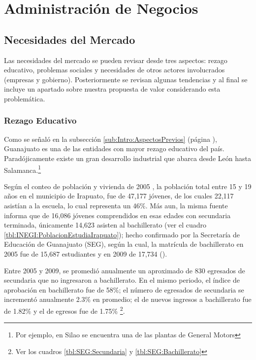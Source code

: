 \chapter{Administración de Negocios}
\label{ch:AdministracionNegocios}

\section{Necesidades del Mercado}

Las necesidades del mercado se pueden revisar desde tres aspectos: rezago educativo, problemas sociales y necesidades de otros actores involucrados (empresas y gobierno). Posteriormente se revisan algunas tendencias y al final se incluye un apartado sobre nuestra propuesta de valor considerando esta problemática.

\subsection{Rezago Educativo}

Como se señaló en la subsección \ref{sub:Intro:AspectosPrevios} (página \pageref{sub:Intro:AspectosPrevios}), Guanajuato es una de las entidades con mayor rezago educativo del país. Paradójicamente existe un gran desarrollo industrial que abarca desde León hasta Salamanca.\footnote{Por ejemplo, en Silao se encuentra una de las plantas de General Motors}

Según el conteo de población y vivienda de 2005 \citep{Inegi2005}, la población total entre 15 y 19 años en el municipio de Irapuato, fue de 47,177 jóvenes, de los cuales 22,117 asistían a la escuela, lo cual representa un 46\%. Más aun, la misma fuente informa que de 16,086 jóvenes comprendidos en esas edades con secundaria terminada, únicamente 14,623 asisten al bachillerato (ver el cuadro \ref{tbl:INEGI:PoblacionEstudiaIrapuato}); hecho confirmado por la Secretaría de Educación de Guanajuato (SEG), según la cual, la matrícula de bachillerato en 2005 fue de 15,687 estudiantes y en 2009 de 17,734 (\citep{Seg2010}).



Entre 2005 y 2009, se promedió anualmente un aproximado de 830 egresados de secundaria que no ingresaron a bachillerato. En el mismo periodo, el índice de aprobación en bachillerato fue de 58\%; el número de egresados de secundaria se incrementó anualmente 2.3\% en promedio; el de nuevos ingresos a bachillerato fue de 1.82\% y el de egresos fue de 1.75\% \citep{Seg2010}\footnote{Ver los cuadros \ref{tbl:SEG:Secundaria} y \ref{tbl:SEG:Bachillerato}}.

